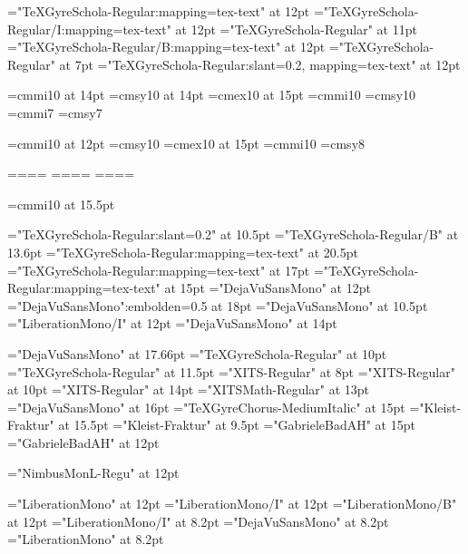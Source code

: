 \font\tenrm="TeXGyreSchola-Regular:mapping=tex-text" at 12pt     \font\tenit="TeXGyreSchola-Regular/I:mapping=tex-text" at 12pt
\font\diezrm="TeXGyreSchola-Regular" at 11pt                     \font\tenbf="TeXGyreSchola-Regular/B:mapping=tex-text" at 12pt
\font\fiverm="TeXGyreSchola-Regular" at 7pt                      \font\tensl="TeXGyreSchola-Regular:slant=0.2, mapping=tex-text" at 12pt

\font\teni=cmmi10 at 14pt    \font\tensy=cmsy10 at 14pt    \font\tenex=cmex10 at 15pt
\font\seveni=cmmi10           \font\sevensy=cmsy10
\font\fivei=cmmi7            \font\fivesy=cmsy7

\font\tenipeq=cmmi10 at 12pt    \font\tensypeq=cmsy10    \font\tenex=cmex10 at 15pt
\font\sevenipeq=cmmi10           \font\sevenypeq=cmsy8

=\tenrm              {}=\teni             {}=\tensy             {}=\tenex
{}=\sevenrm          {}=\seveni         {}=\sevensy         {}=\tenex
{}=\fiverm     {}=\fivei    {}=\fivesy    {}=\tenex

\font\mathlista=cmmi10 at 15.5pt

\font\ffoot="TeXGyreSchola-Regular:slant=0.2" at 10.5pt
\font\fnumpag="TeXGyreSchola-Regular/B" at 13.6pt
\font\fencp="TeXGyreSchola-Regular:mapping=tex-text" at 20.5pt
\font\fencs="TeXGyreSchola-Regular:mapping=tex-text" at 17pt
\font\fenct="TeXGyreSchola-Regular:mapping=tex-text" at 15pt
\font\fcode="DejaVuSansMono" at 12pt
\font\fc="DejaVuSansMono":embolden=0.5 at 18pt
\font\fcfoot="DejaVuSansMono" at 10.5pt
\font\fcodenoterm="LiberationMono/I" at 12pt
\font\fcodej="DejaVuSansMono" at 14pt

\font\festrella="DejaVuSansMono" at 17.66pt
\font\fpies="TeXGyreSchola-Regular" at 10pt
\font\fitems="TeXGyreSchola-Regular" at 11.5pt
\font\fsimbs="XITS-Regular" at 8pt
\font{}="XITS-Regular" at 10pt
\font\fsimbols="XITS-Regular" at 14pt
\font\fmats="XITSMath-Regular" at 13pt
\font\fflecha="DejaVuSansMono" at 16pt
\font\machine="TeXGyreChorus-MediumItalic" at 15pt
\font\ffraktur="Kleist-Fraktur" at 15.5pt
\font\ffraktursub="Kleist-Fraktur" at 9.5pt
\font\fgabriele="GabrieleBadAH" at 15pt
\font\fgabrielen="GabrieleBadAH" at 12pt

\font\for="NimbusMonL-Regu" at 12pt

\font\fgramat="LiberationMono" at 12pt
\font\fgramatnoterm="LiberationMono/I" at 12pt
\font\fgramatterm="LiberationMono/B" at 12pt
\font\fsupnoterm="LiberationMono/I" at 8.2pt
\font\fsup="DejaVuSansMono" at 8.2pt
\font\fgramatsup="LiberationMono" at 8.2pt

